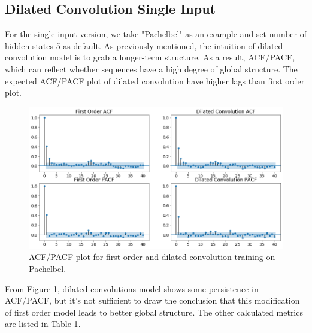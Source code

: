 \documentclass[10pt, oneside]{article}
\begin{document}
\subsection{Dilated Convolution Single Input}
For the single input version, we take "Pachelbel" as an example and set number of hidden states 5 as default. As previously mentioned, the intuition of dilated convolution model is to grab a longer-term structure. As a result, ACF/PACF, which can reflect whether sequences have a high degree of global structure. The expected ACF/PACF plot of dilated convolution have higher lags than first order plot.
\begin{figure}[H]

  \includegraphics[width=\linewidth]{ACF.png}

  \label{fig: ACF}
    \caption{ACF/PACF plot for first order and dilated convolution training on Pachelbel.}
\end{figure}

From \hyperref[fig: ACF]{Figure 1}, dilated convolutions model shows some persistence in ACF/PACF, but it's not sufficient to draw the conclusion that this modification of first order model leads to better global structure. 
The other calculated metrics are listed in \hyperref[table:metrics]{Table 1}. 
\\
\end{document}
